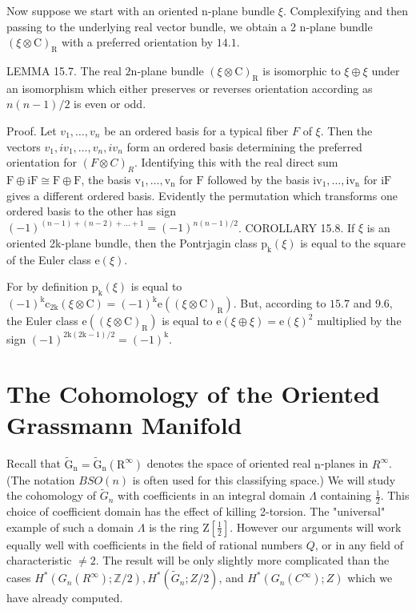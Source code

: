 \documentclass[10pt]{article}
\begin{document}
Now suppose we start with an oriented n-plane bundle $\xi$. Complexifying and then passing to the underlying real vector bundle, we obtain a 2 n-plane bundle $(\xi \otimes \mathrm{C})_{\mathrm{R}}$ with a preferred orientation by $14.1$.

LEMMA 15.7. The real $2 \mathrm{n}$-plane bundle $(\xi \otimes \mathrm{C})_{\mathrm{R}}$ is isomorphic to $\xi \oplus \xi$ under an isomorphism which either preserves or reverses orientation according as $n(n-1) / 2$ is even or odd.

Proof. Let $v_{1}, \ldots, v_{n}$ be an ordered basis for a typical fiber $F$ of $\xi$. Then the vectors $v_{1}, i v_{1}, \ldots, v_{n}, i v_{n}$ form an ordered basis determining the preferred orientation for $(F \otimes C)_{R}$. Identifying this with the real direct sum $\mathrm{F} \oplus \mathrm{iF} \cong \mathrm{F} \oplus \mathrm{F}$, the basis $\mathrm{v}_{1}, \ldots, \mathrm{v}_{\mathrm{n}}$ for $\mathrm{F}$ followed by the basis $\mathrm{iv}_{1}, \ldots, \mathrm{i} \mathrm{v}_{\mathrm{n}}$ for $\mathrm{iF}$ gives a different ordered basis. Evidently the permutation which transforms one ordered basis to the other has sign $(-1)^{(n-1)+(n-2)+\ldots+1}=(-1)^{n(n-1) / 2}$. COROLLARY 15.8. If $\xi$ is an oriented 2k-plane bundle, then the Pontrjagin class $\mathrm{p}_{\mathrm{k}}(\xi)$ is equal to the square of the Euler class $\mathrm{e}(\xi)$.

For by definition $\mathrm{p}_{\mathrm{k}}(\xi)$ is equal to $(-1)^{\mathrm{k}} \mathrm{c}_{2 \mathrm{k}}(\xi \otimes \mathrm{C})=(-1)^{\mathrm{k}} \mathrm{e}\left((\xi \otimes \mathrm{C})_{\mathrm{R}}\right)$. But, according to $15.7$ and 9.6, the Euler class $\mathrm{e}\left((\xi \otimes \mathrm{C})_{\mathrm{R}}\right)$ is equal to $\mathrm{e}(\xi \oplus \xi)=\mathrm{e}(\xi)^{2}$ multiplied by the sign $(-1)^{2 \mathrm{k}(2 \mathrm{k}-1) / 2}=(-1)^{\mathrm{k}}$.

\section{The Cohomology of the Oriented Grassmann Manifold}
Recall that $\tilde{\mathrm{G}}_{\mathrm{n}}=\tilde{\mathrm{G}}_{\mathrm{n}}\left(\mathrm{R}^{\infty}\right)$ denotes the space of oriented real $\mathrm{n}$-planes in $R^{\infty}$. (The notation $B S O(n)$ is often used for this classifying space.) We will study the cohomology of $\widetilde{G}_{n}$ with coefficients in an integral domain $\Lambda$ containing $\frac{1}{2}$. This choice of coefficient domain has the effect of killing 2-torsion. The "universal" example of such a domain $\Lambda$ is the ring $\mathrm{Z}\left[\frac{1}{2}\right]$. However our arguments will work equally well with coefficients in the field of rational numbers $Q$, or in any field of characteristic $\neq 2$. The result will be only slightly more complicated than the cases $H^{*}\left(G_{n}\left(R^{\infty}\right) ; \mathbb{Z} / 2\right), H^{*}\left(\widetilde{G}_{n} ; Z / 2\right)$, and $H^{*}\left(G_{n}\left(C^{\infty}\right) ; Z\right)$ which we have already computed.
\end{document}
